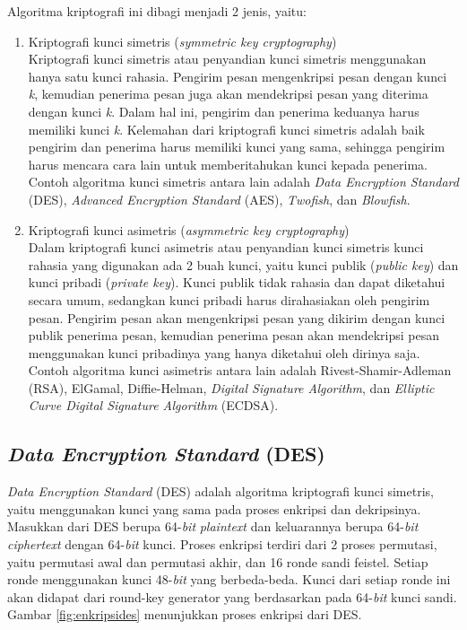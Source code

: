 Algoritma kriptografi ini dibagi menjadi 2 jenis, yaitu:
\begin{enumerate}
	\item Kriptografi kunci simetris (\textit{symmetric key cryptography})\\
		Kriptografi kunci simetris atau penyandian kunci simetris menggunakan hanya satu kunci rahasia. Pengirim pesan mengenkripsi pesan dengan kunci \textit{k}, kemudian penerima pesan juga akan mendekripsi pesan yang diterima dengan kunci \textit{k}. Dalam hal ini, pengirim dan penerima keduanya harus memiliki kunci \textit{k}. Kelemahan dari kriptografi kunci simetris adalah baik pengirim dan penerima harus memiliki kunci yang sama, sehingga pengirim harus mencara cara lain untuk memberitahukan kunci kepada penerima. Contoh algoritma kunci simetris antara lain adalah \textit{Data Encryption Standard} (DES), \textit{Advanced Encryption Standard} (AES), \textit{Twofish}, dan \textit{Blowfish}.
	\item Kriptografi kunci asimetris (\textit{asymmetric key cryptography})\\
	Dalam kriptografi kunci asimetris atau penyandian kunci simetris kunci rahasia yang digunakan ada 2 buah kunci, yaitu kunci publik (\textit{public key}) dan kunci pribadi (\textit{private key}). Kunci publik tidak rahasia dan dapat diketahui secara umum, sedangkan kunci pribadi harus dirahasiakan oleh pengirim pesan. Pengirim pesan akan mengenkripsi pesan yang dikirim dengan kunci publik penerima pesan, kemudian penerima pesan akan mendekripsi pesan menggunakan kunci pribadinya yang hanya diketahui oleh dirinya saja. Contoh algoritma kunci asimetris antara lain adalah Rivest-Shamir-Adleman (RSA), ElGamal, Diffie-Helman, \textit{Digital Signature Algorithm}, dan \textit{Elliptic Curve Digital Signature Algorithm} (ECDSA).
\end{enumerate}

\subsection{\textit{Data Encryption Standard} (DES)}
\textit{Data Encryption Standard} (DES) adalah algoritma kriptografi kunci simetris, yaitu menggunakan kunci yang sama pada proses enkripsi dan dekripsinya. Masukkan dari DES berupa 64-\textit{bit} \textit{plaintext} dan keluarannya berupa 64-\textit{bit} \textit{ciphertext} dengan 64-\textit{bit} kunci. Proses enkripsi terdiri dari 2 proses permutasi, yaitu permutasi awal dan permutasi akhir, dan 16 ronde sandi feistel. Setiap ronde menggunakan kunci 48-\textit{bit} yang berbeda-beda. Kunci dari setiap ronde ini akan didapat dari round-key generator yang berdasarkan pada 64-\textit{bit} kunci sandi. Gambar \ref{fig:enkripsides} menunjukkan proses enkripsi dari DES.

